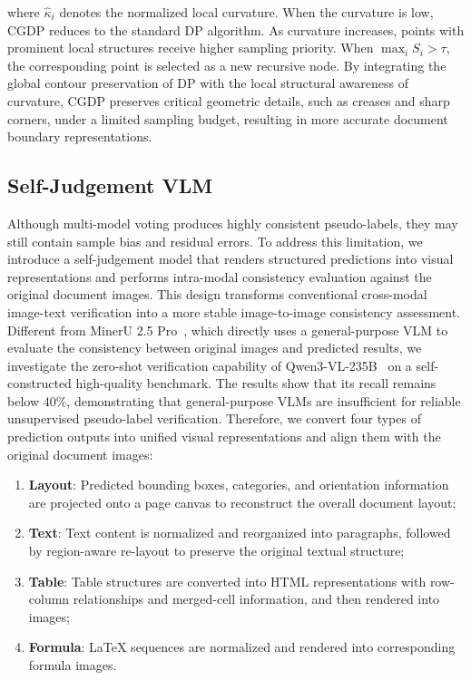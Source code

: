 \documentclass{fairmeta}
\begin{document}
where $\hat{\kappa}_i$ denotes the normalized local curvature. When the curvature is low, CGDP reduces to the standard DP algorithm. As curvature increases, points with prominent local structures receive higher sampling priority. When $\max_i S_i>\tau$, the corresponding point is selected as a new recursive node. By integrating the global contour preservation of DP with the local structural awareness of curvature, CGDP preserves critical geometric details, such as creases and sharp corners, under a limited sampling budget, resulting in more accurate document boundary representations.


\subsection{Self-Judgement VLM}
Although multi-model voting produces highly consistent pseudo-labels, they may still contain sample bias and residual errors. To address this limitation, we introduce a self-judgement model that renders structured predictions into visual representations and performs intra-modal consistency evaluation against the original document images. This design transforms conventional cross-modal image-text verification into a more stable image-to-image consistency assessment. Different from MinerU 2.5 Pro~\cite{wang2026mineru2}, which directly uses a general-purpose VLM to evaluate the consistency between original images and predicted results, we investigate the zero-shot verification capability of Qwen3-VL-235B~\cite{yang2025qwen3} on a self-constructed high-quality benchmark. The results show that its recall remains below $40\%$, demonstrating that general-purpose VLMs are insufficient for reliable unsupervised pseudo-label verification. Therefore, we convert four types of prediction outputs into unified visual representations and align them with the original document images:

\begin{enumerate}
\item \textbf{Layout}: Predicted bounding boxes, categories, and orientation information are projected onto a page canvas to reconstruct the overall document layout;
\item \textbf{Text}: Text content is normalized and reorganized into paragraphs, followed by region-aware re-layout to preserve the original textual structure;
\item \textbf{Table}: Table structures are converted into HTML representations with row-column relationships and merged-cell information, and then rendered into images;
\item \textbf{Formula}: LaTeX sequences are normalized and rendered into corresponding formula images.
\end{enumerate}
\end{document}
